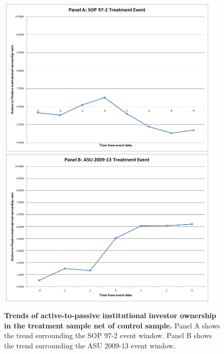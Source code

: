 \documentclass[thesis]{thesis-umich}
\begin{document}
\begin{figure}[H] 
\centering
\includegraphics[width=6in, height=3in]{figures/sop972-trends}
\vspace{10mm}
\includegraphics[width=6in, height=3in]{figures/asu200913-trends}
\captionsetup{justification=centering, width=.95\textwidth} 
\caption[\textbf{Trends of active-to-passive institutional investor ownership in the treatment sample net of control sample.}]{\footnotesize \textbf{Trends of active-to-passive institutional investor ownership in the treatment sample net of control sample.} Panel A shows the trend surrounding the SOP 97-2 event window. Panel B shows the trend surrounding the ASU 2009-13 event window.} \label{trends}
\end{figure} 
\newpage
 
\newpage 
 
\newpage

\newpage

\newpage

\newpage
 
\newpage

\newpage 

\newpage 

\newpage 
 
\newpage

\newpage

\newpage

\newpage

\justify
\begingroup

\normalfont
\normalsize
    \setlength{\bibsep}{10pt}
    
\endgroup
\end{document}
